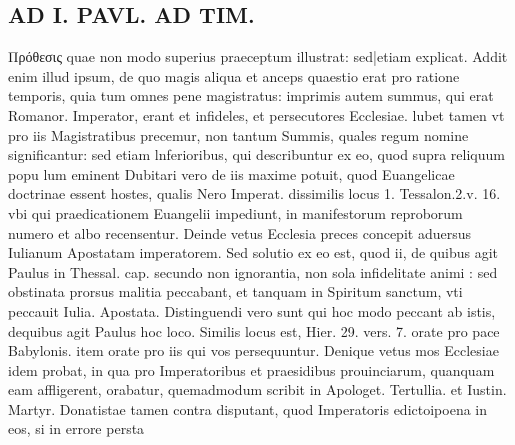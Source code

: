 \documentclass{article}
\begin{document}
\begin{pages}
\section*{AD I. PAVL. AD TIM. }
\marginpar{[ p.48 ]}\pstart Πρόθεσις quae non modo superius praeceptum illustrat: sed|etiam explicat. Addit enim illud ipsum, de quo magis aliqua et anceps quaestio erat pro ratione temporis, quia tum omnes pene magistratus: imprimis autem summus, qui erat Romanor. Imperator, erant et infideles, et persecutores Ecclesiae. lubet tamen vt pro iis Magistratibus precemur, non tantum Summis, quales regum nomine significantur: sed etiam lnferioribus, qui describuntur ex eo, quod supra reliquum popu lum eminent Dubitari vero de iis maxime potuit, quod Euangelicae doctrinae essent hostes, qualis Nero Imperat. dissimilis locus 1. Tessalon.2.v. 16. vbi qui praedicationem Euangelii impediunt, in manifestorum reproborum numero et albo recensentur. Deinde vetus Ecclesia preces concepit aduersus Iulianum Apostatam imperatorem. Sed solutio ex eo est, quod ii, de quibus agit Paulus in Thessal. cap. secundo non ignorantia, non sola infidelitate animi : sed obstinata prorsus malitia peccabant, et tanquam in Spiritum sanctum, vti peccauit Iulia. Apostata. Distinguendi vero sunt qui hoc modo peccant ab istis, dequibus agit Paulus hoc loco. Similis locus est, Hier. 29. vers. 7. orate pro pace Babylonis. item orate pro iis qui vos persequuntur. Denique vetus mos Ecclesiae idem probat, in qua pro Imperatoribus et praesidibus prouinciarum, quanquam eam affligerent, orabatur, quemadmodum scribit in Apologet. Tertullia. et Iustin. Martyr. Donatistae tamen contra disputant, quod Imperatoris edictoipoena in eos, si in errore persta\pend

\end{pages}
\end{document}

